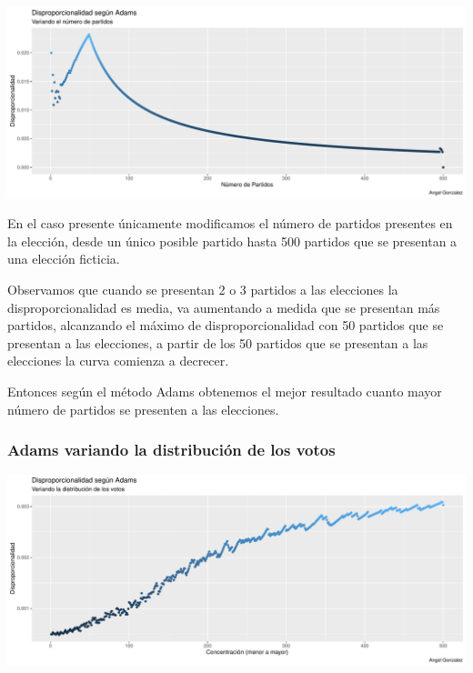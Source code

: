\documentclass[12pt,a4paper,]{book}
\numberwithin{dummy}{section}
\theoremstyle{ocrenumbox}
\theoremstyle{blacknumex}
\theoremstyle{blacknumbox}
\theoremstyle{ocrenum}
\theoremstyle{ocrenum}
\begin{document}
\begin{center}\includegraphics[width=0.95\linewidth]{figurasR/unnamed-chunk-35-1} \end{center}

En el caso presente únicamente modificamos el número de partidos
presentes en la elección, desde un único posible partido hasta 500
partidos que se presentan a una elección ficticia.

Observamos que cuando se presentan 2 o 3 partidos a las elecciones la
disproporcionalidad es media, va aumentando a medida que se presentan
más partidos, alcanzando el máximo de disproporcionalidad con 50
partidos que se presentan a las elecciones, a partir de los 50 partidos
que se presentan a las elecciones la curva comienza a decrecer.

Entonces según el método Adams obtenemos el mejor resultado cuanto mayor
número de partidos se presenten a las elecciones.

\hypertarget{adams-variando-la-distribuciuxf3n-de-los-votos}{%
\subsubsection{Adams variando la distribución de los
votos}\label{adams-variando-la-distribuciuxf3n-de-los-votos}}

\begin{center}\includegraphics[width=0.95\linewidth]{figurasR/unnamed-chunk-36-1} \end{center}
\end{document}
